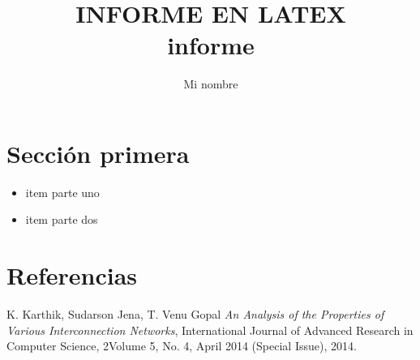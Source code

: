 \documentclass[a4paper]{article}
\title{
    INFORME EN LATEX \\
    informe
}
\author{Mi nombre}
\begin{document}
\maketitle

\section{Sección primera}


\begin{itemize}
    \item item parte uno
    \item item parte dos
    
\end{itemize}


\section{Referencias}
\begin{thebibliography}{a}
    K. Karthik, Sudarson Jena, T. Venu Gopal
  \textit{An Analysis of the Properties of Various Interconnection Networks},
  International Journal of Advanced Research in Computer Science,
  2Volume 5, No. 4, April 2014 (Special Issue),
  2014.
\end{thebibliography}
\end{document}
